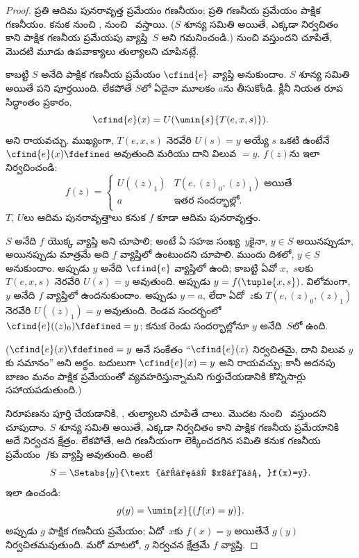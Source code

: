 \documentclass[../../../include/open-logic-section]{subfiles}
\begin{document}
\begin{proof}
ప్రతి ఆదిమ పునరావృత్త ప్రమేయం గణనీయం; ప్రతి గణనీయ ప్రమేయం పాక్షిక
గణనీయం. కనుక  నుంచి ,
 నుంచి~ వస్తాయి. ($S$ శూన్య సమితి
అయితే, ఎక్కడా నిర్వచితం కాని పాక్షిక గణనీయ ప్రమేయపు వ్యాప్తి~$S$ అని
గమనించండి.)  నుంచి  వస్తుందని
చూపితే, మొదటి మూడు ఉపవాక్యాలు తుల్యాలని చూపినట్లే.

కాబట్టి $S$ అనేది పాక్షిక గణనీయ ప్రమేయం $\cfind{e}$ వ్యాప్తి
అనుకుందాం. $S$ శూన్య సమితి అయితే పని పూర్తయింది. లేకపోతే $S$లో ఏదైనా
మూలకం $a$ను తీసుకోండి. క్లీనీ నియత రూప సిద్ధాంతం ప్రకారం,
\[
\cfind{e}(x)=U(\umin{s}{T(e,x,s)}).
\]
అని రాయవచ్చు. ముఖ్యంగా, $T(e,x,s)$ నెరవేరి $U(s)=y$ అయ్యే $s$
ఒకటి ఉంటేనే $\cfind{e}(x)\fdefined$ అవుతుంది మరియు
దాని విలువ $=y$. $f(z)$ను ఇలా నిర్వచించండి:
\[
f(z)=\begin{cases}
  U((z)_1) & \text{$T(e,(z)_0,(z)_1)$ అయితే} \\
  a & \text{ఇతర సందర్భాల్లో.}
\end{cases}
\]
$T$, $U$లు ఆదిమ పునరావృత్తాలు కనుక $f$ కూడా ఆదిమ పునరావృత్తం.

$S$ అనేది $f$ యొక్క వ్యాప్తి అని చూపాలి; అంటే ఏ సహజ సంఖ్య~$y$కైనా,
$y\in S$ అయినప్పుడూ, అయినప్పుడు మాత్రమే అది $f$ వ్యాప్తిలో ఉంటుందని చూపాలి. ముందు దిశలో,
$y\in S$ అనుకుందాం. అప్పుడు $y$ అనేది $\cfind{e}$ వ్యాప్తిలో ఉంది;
కాబట్టి ఏవో $x$,~$s$లకు $T(e,x,s)$ నెరవేరి $U(s)=y$ అవుతుంది.
అప్పుడు $y=f(\tuple{x,s})$. విలోమంగా, $y$ అనేది $f$ వ్యాప్తిలో
ఉందనుకుందాం. అప్పుడు $y=a$, లేదా ఏదో~$z$కు $T(e,(z)_0,(z)_1)$
నెరవేరి $U((z)_1)=y$ అవుతుంది. రెండవ సందర్భంలో
$\cfind{e}((z)_0)\fdefined=y$; కనుక రెండు సందర్భాల్లోనూ $y$ అనేది~$S$లో ఉంది.

($\cfind{e}(x)\fdefined=y$ అనే సంకేతం ``$\cfind{e}(x)$ నిర్వచితమై,
దాని విలువ $y$కు సమానం'' అని అర్థం. బదులుగా $\cfind{e}(x)=y$ అని
రాయవచ్చు; కానీ అదనపు బాణం మనం పాక్షిక ప్రమేయంతో వ్యవహరిస్తున్నామని
గుర్తుచేయడానికి కొన్నిసార్లు సహాయపడుతుంది.)

 నిరూపణను పూర్తి చేయడానికి, ,
 తుల్యాలని చూపితే చాలు. మొదట 
నుంచి~ వస్తుందని చూపుదాం. $S$ శూన్య సమితి అయితే,
ఎక్కడా నిర్వచితం కాని పాక్షిక గణనీయ ప్రమేయానికి అదే నిర్వచన క్షేత్రం.
లేకపోతే, అది గణనీయంగా లెక్కించదగిన సమితి కనుక గణనీయ ప్రమేయం~$f$కు
వ్యాప్తి అవుతుంది. అంటే
\[
S=\Setabs{y}{\text{ఏదో $x$కు, }f(x)=y}.
\]
ఇలా ఉంచండి:
\[
g(y)=\umin{x}{(f(x)=y)}.
\]
అప్పుడు $g$ పాక్షిక గణనీయ ప్రమేయం; ఏదో~$x$కు $f(x)=y$ అయితేనే
$g(y)$ నిర్వచితమవుతుంది. మరో మాటలో, $g$ నిర్వచన క్షేత్రమే $f$
వ్యాప్తి. 


\end{proof}
\end{document}

